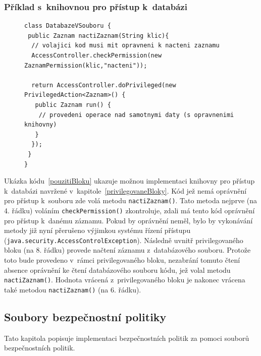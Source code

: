 \subsubsection{Příklad s~knihovnou pro přístup k~databázi}\label{databazeVsouboru}

\begin{figure}[b]
\begin{lstlisting}[caption=Demonstrační knihovna pro přístup k~databázi, label=pouzitiBloku]
class DatabazeVSouboru {
 public Zaznam nactiZaznam(String klic){
  // volajici kod musi mit opravneni k nacteni zaznamu
  AccessController.checkPermission(new ZaznamPermission(klic,"nacteni"));
  
  return AccessController.doPrivileged(new PrivilegedAction<Zaznam>() {
   public Zaznam run() {
    // provedeni operace nad samotnymi daty (s opravnenimi knihovny)
   }
  });
 }
}
\end{lstlisting}
\end{figure}

Ukázka kódu~\ref{pouzitiBloku} ukazuje možnou implementaci knihovny pro přístup k~databázi navržené v~kapitole~\ref{privilegovaneBloky}.
Kód jež nemá oprávnění pro přístup k~souboru zde volá metodu {\tt nactiZaznam()}.
Tato metoda nejprve (na 4. řádku) voláním {\tt checkPermission()} zkontroluje, zdali má tento kód oprávnění pro přístup k~danému záznamu.
Pokud by oprávnění neměl, bylo by vykonávání metody již nyní přerušeno výjimkou systému řízení přístupu ({\tt java.security.AccessControlException}).
Následně uvnitř privilegovaného bloku (na 8. řádku) provede načtení záznamu z~databázového souboru.
Protože toto bude provedeno v~rámci privilegovaného bloku, nezabrání tomuto čtení absence oprávnění ke čtení databázového souboru kódu, jež volal metodu {\tt nactiZaznam()}.
Hodnota vrácená z~privilegovaného bloku je nakonec vrácena také metodou {\tt nactiZaznam()} (na 6. řádku).

\subsection{Soubory bezpečnostní politiky} \label{souboryBP}

Tato kapitola popisuje implementaci bezpečnostních politik za pomoci souborů bezpečnostních politik.

